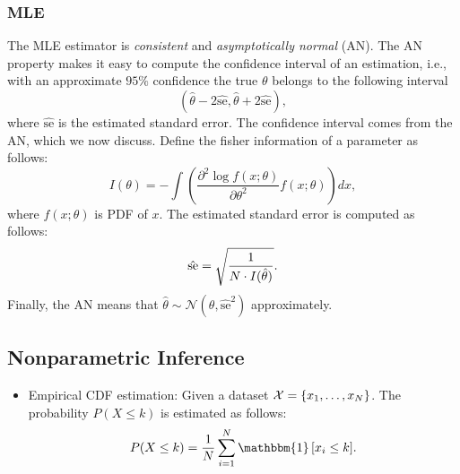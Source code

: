\subsubsection{MLE}
    The MLE estimator is \emph{consistent} and \emph{asymptotically normal} (AN).
    The AN property makes it easy to compute the confidence interval of an estimation, i.e., with an approximate $95\%$ confidence  the true $\theta$ belongs to the following interval
        \begin{equation}
            \left( \hat{\theta} - 2\hat{\text{se}},  \hat{\theta} + 2\hat{\text{se}} \right),
        \end{equation}
    where $\hat{\text{se}}$ is the estimated standard error.
    The confidence interval comes from the AN, which we now discuss.
    Define the fisher information of a parameter as follows:
        \begin{equation}
            I(\theta) = -\int \left( \frac{\partial^2 \log f(x; \theta)}{\partial \theta^2} f(x; \theta) \right) d x,
        \end{equation}
    where $f(x; \theta)$ is PDF of $x$.
    The estimated standard error is computed as follows:
        \begin{equation}
            \hat{\text{se}} = \sqrt{\frac{1}{N \cdot I(\hat{\theta})}}.
        \end{equation}
    Finally, the AN means that $\hat{\theta} \sim \mathcal{N}(\theta, \hat{\text{se}}^2 )$ approximately.
    

\subsection{Nonparametric Inference}
    \begin{itemize}
        \item Empirical CDF estimation: Given a dataset $\mathcal{X}=\{ x_1, \ldots, x_N \}$.
        The probability $P(X \le k)$ is estimated as follows:
            \begin{equation}
                P(X \le k) = \frac{1}{\ndata}\sum_{i=1}^{\ndata}{\mathbbm{1}
                    \left[ x_i \le k \right]
                }.
            \end{equation}
    \end{itemize}
    